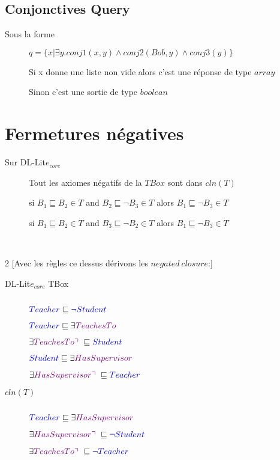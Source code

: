 \subsection{Conjonctives Query}
\begin{description}
\item[Sous la forme] $q = \{x | \exists y.conj1(x,y) \wedge conj2(Bob, y) \wedge conj3(y)\}$
\item[] Si x donne une liste non vide alors c'est une réponse de type $array$
\item[] Sinon c'est une sortie de type $boolean$
\end{description}

\section{Fermetures négatives}
\begin{description}
\item[Sur DL-Lit$e_{core}$] Tout les axiomes négatifs de la $TBox$ sont dans $cln(T)$
\item[] si $B_1 \sqsubseteq B_2 \in T$ and $B_2 \sqsubseteq \neg B_3 \in T$ alors $B_1 \sqsubseteq \neg B_3 \in T$
\item[] si $B_1 \sqsubseteq B_2 \in T$ and $B_3 \sqsubseteq \neg B_2 \in T$ alors $B_1 \sqsubseteq \neg B_3 \in T$
\end{description}
\ \\
\begin{multicols}{2}
[Avec les règles ce dessus dérivons les $negated\ closure$:]
\begin{description}
\item[DL-Lit$e_{core}$ TBox] $ $
\item[] $\textcolor{blue}{Teacher} \sqsubseteq \textcolor{blue}{\neg Student}$
\item[] $\textcolor{blue}{Teacher} \sqsubseteq \exists \textcolor{violet}{TeachesTo}$
\item[] $\exists \textcolor{violet}{TeachesTo \urcorner\  } \sqsubseteq \textcolor{blue}{Student}$
\item[] $\textcolor{blue}{Student} \sqsubseteq \exists \textcolor{violet}{HasSupervisor}$
\item[] $\exists \textcolor{violet}{HasSupervisor \urcorner\ } \sqsubseteq \textcolor{blue}{Teacher}$
\end{description}

\begin{description}
\item[$cln(T)$] $ $
\item[] $\textcolor{blue}{Teacher} \sqsubseteq \exists \textcolor{violet}{HasSupervisor}$
\item[] $\exists \textcolor{violet}{HasSupervisor \urcorner\ } \sqsubseteq \textcolor{blue}{\neg Student}$
\item[] $\exists \textcolor{violet}{TeachesTo \urcorner\  } \sqsubseteq \textcolor{blue}{\neg Teacher}$
\item[] $ $
\item[] $ $
\end{description}

\end{multicols}

\pagebreak
